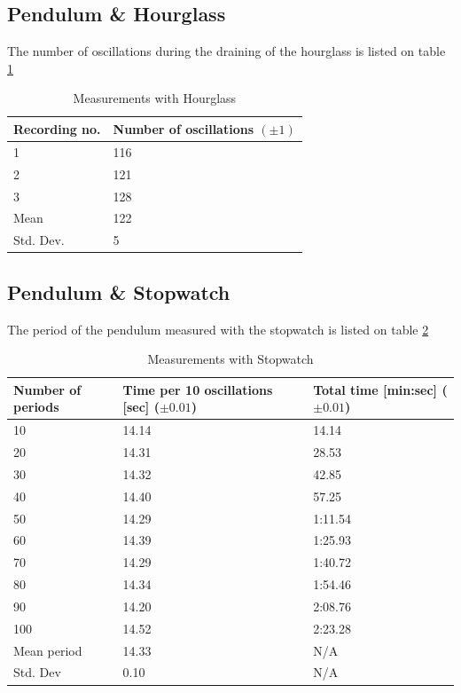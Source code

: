 \documentclass[%
 reprint,
 amsmath,amssymb,
 aps,
]{revtex4-1}
\begin{document}
	\subsection{Pendulum \& Hourglass}

    The number of oscillations during the draining of the hourglass is listed on table \ref{tab:hourglass}

	\begin{table}[h] %
        \center
        \caption{Measurements with Hourglass}
        \label{tab:hourglass}
        \begin{tabular}{| l | l |}
            \hline
            Recording no. & Number of oscillations $(\pm 1)$\\ \hline
            1 & 116 \\ \hline
            2 & 121 \\ \hline
            3 & 128 \\ \hline
            \hline
            Mean & 122 \\ \hline
            Std. Dev. & 5 \\\hline
        \end{tabular}
	\end{table}

	\subsection{Pendulum \& Stopwatch}

    The period of the pendulum measured with the stopwatch is listed on table \ref{tab:stopwatch}

	\begin{table}[h] %
        \center
        \caption{Measurements with Stopwatch}
        \label{tab:stopwatch}
	    \begin{tabular}{| p{1.5cm} | p{2cm} | p{2cm} |}
		    \hline
		    Number of periods & Time per 10 oscillations [sec] ($\pm 0.01$) & Total time [min:sec] ($\pm 0.01$)\\ \hline
		    10 & 14.14 & 14.14 \\ \hline
		    20 & 14.31 & 28.53 \\ \hline
		    30 & 14.32 & 42.85 \\ \hline
		    40 & 14.40 & 57.25 \\ \hline
		    50 & 14.29 & 1:11.54 \\ \hline
		    60 & 14.39 & 1:25.93 \\ \hline
		    70 & 14.29 & 1:40.72 \\ \hline
		    80 & 14.34 & 1:54.46 \\ \hline
		    90 & 14.20 & 2:08.76 \\ \hline
		    100 & 14.52 & 2:23.28 \\ \hline
            \hline
            Mean period & 14.33 & N/A \\ \hline
            Std. Dev & 0.10 & N/A \\ \hline
        \end{tabular}
    \end{table}
    
\end{document}
